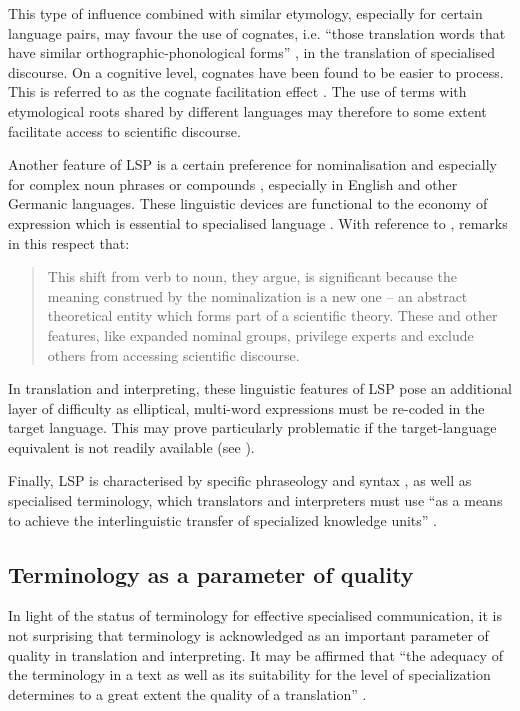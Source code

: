 This type of influence combined with similar etymology, especially for certain language pairs, may favour the use of cognates, i.e. ``those translation words that have similar orthographic-phonological forms'' \citep[1285]{costa2000cognate}, in the translation of specialised discourse. On a cognitive level, cognates have been found to be easier to process. This is referred to as the cognate facilitation effect \citep{costa2000cognate}. The use of terms with etymological roots shared by different languages may therefore to some extent facilitate access to scientific discourse.

Another feature of LSP is a certain preference for nominalisation and especially for complex noun phrases or compounds \citep[247]{olohan2008scientific}, especially in English and other Germanic languages. These linguistic devices are functional to the economy of expression which is essential to specialised language \citep[135]{pignataro2012terminology}. With reference to \citet{halliday2003writing}, \citet[428]{olohan2013scientific} remarks in this respect that:

\begin{quote}
This shift from verb to noun, they argue, is significant because the meaning construed by the nominalization is a new one – an abstract theoretical entity which forms part of a scientific theory. These and other features, like expanded nominal groups, privilege experts and exclude others from accessing scientific discourse.
\end{quote}

In translation and interpreting, these linguistic features of LSP pose an additional layer of difficulty as elliptical, multi-word expressions must be re-coded in the target language. This may prove particularly problematic if the target-language equivalent is not readily available (see ).

Finally, LSP is characterised by specific phraseology and syntax \citep[426]{olohan2013scientific}, as well as specialised terminology, which translators and interpreters must use ``as a means to achieve the interlinguistic transfer of specialized knowledge units'' \citep[447]{velasquez2002traduccion}.

\subsection{Terminology as a parameter of quality} \label{termquality}
In light of the status of terminology for effective specialised communication, it is not surprising that terminology is acknowledged as an important parameter of quality in translation and interpreting. It may be affirmed that ``the adequacy of the terminology in a text as well as its suitability for the level of specialization determines to a great extent the quality of a translation'' \citep[91]{martinez2009terminological}.

